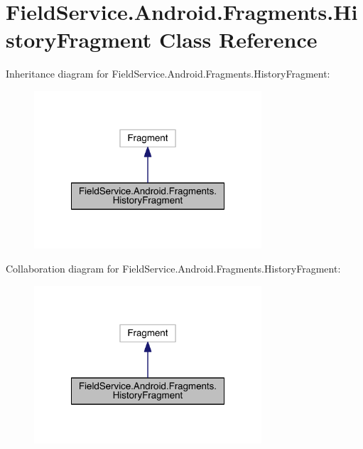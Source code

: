 \hypertarget{class_field_service_1_1_android_1_1_fragments_1_1_history_fragment}{\section{Field\+Service.\+Android.\+Fragments.\+History\+Fragment Class Reference}
\label{class_field_service_1_1_android_1_1_fragments_1_1_history_fragment}
}


Inheritance diagram for Field\+Service.\+Android.\+Fragments.\+History\+Fragment\+:
\nopagebreak
\begin{figure}[H]
\begin{center}
\leavevmode
\includegraphics[width=240pt]{class_field_service_1_1_android_1_1_fragments_1_1_history_fragment__inherit__graph}
\end{center}
\end{figure}


Collaboration diagram for Field\+Service.\+Android.\+Fragments.\+History\+Fragment\+:
\nopagebreak
\begin{figure}[H]
\begin{center}
\leavevmode
\includegraphics[width=240pt]{class_field_service_1_1_android_1_1_fragments_1_1_history_fragment__coll__graph}
\end{center}
\end{figure}
